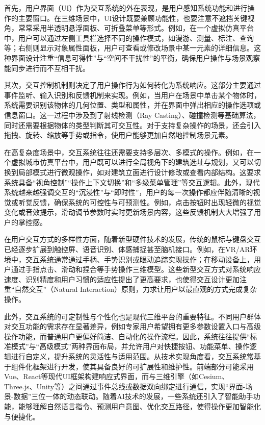 首先，用户界面（UI）作为交互系统的外在表现，是用户感知系统功能和进行操作的主要窗口。在三维场景中，UI设计既要兼顾功能性，也要注意不遮挡关键视角，常常采用半透明悬浮面板、可折叠菜单等形式。例如，在一个虚拟仿真平台中，用户可以通过左侧工具栏选择不同的操作模式，如漫游、测量、标注、查询等；右侧则显示对象属性面板，用户可查看或修改场景中某一元素的详细信息。这种界面设计注重``信息可得性''与``空间不干扰性''的平衡，确保用户操作与场景观察能同步进行而不互相干扰。

其次，交互控制机制则决定了用户操作行为如何转化为系统响应。这部分主要通过事件监听、输入识别和反馈机制来实现。例如，当用户在场景中单击某个物体时，系统需要识别该物体的几何位置、类型和属性，并在界面中弹出相应的操作选项或信息窗口。这一过程中涉及到了射线检测（Ray Casting）、碰撞检测等基础算法，同时还需要根据物体的类型判断其可交互性。对于支持复杂操作的场景，还会引入拖拽、旋转、缩放等手势或指令，使用户能够更加自然地控制场景元素。

在高复杂度场景中，交互系统往往还需要支持多层次、多模式的操作。例如，在一个虚拟城市仿真平台中，用户既可以进行全局视角下的建筑选址与规划，又可以切换到局部模式进行微观操作，如对建筑立面进行设计修改或查看内部结构。这要求系统具备``视角控制''``操作上下文切换''和``多级菜单管理''等交互逻辑。此外，现代系统越来越强调交互的``沉浸性''与``即时性''，用户的每一次操作都应伴随清晰的视觉或听觉反馈，确保系统的可控性与可预测性。例如，点击按钮时出现轻微的视觉变化或音效提示，滑动调节参数时实时更新场景内容，这些反馈机制大大增强了用户的掌控感。

在用户交互方式的多样性方面，随着新型硬件技术的发展，传统的鼠标与键盘交互已经逐步扩展到触控屏、语音识别、体感捕捉甚至脑机接口。例如，在VR/AR环境中，交互系统通常通过手柄、手势识别或眼动追踪实现操作；在移动设备上，用户通过手指点击、滑动和捏合等手势操作三维模型。这些新型交互方式对系统响应速度、识别精度和用户习惯的适应性提出了更高要求，也使得交互设计更加注重``自然交互''（Natural Interaction）原则，力求让用户以最直观的方式完成复杂操作。

此外，交互系统的可定制性与个性化也是现代三维平台的重要特征。不同用户群体对交互功能的需求存在显著差异，例如专家用户希望拥有更多参数设置入口与高级操作功能，而普通用户更偏好简洁、自动化的操作流程。因此，系统往往提供``标准模式''与``高级模式''两种界面布局，并允许用户对快捷按钮、功能菜单、操作逻辑进行自定义，提升系统的灵活性与适用范围。从技术实现角度看，交互系统常基于组件化框架进行开发，使其具备良好的可扩展性和维护性。前端部分可能采用Vue、React等现代UI框架构建响应式界面，而与三维引擎（如Cesium、Three.js、Unity等）之间通过事件总线或数据双向绑定进行通信，实现``界面-场景-数据''三位一体的动态联动。随着AI技术的发展，一些系统还引入了智能助手功能，能够理解自然语言指令、预测用户意图、优化交互路径，使得操作更加智能化与便捷化。


